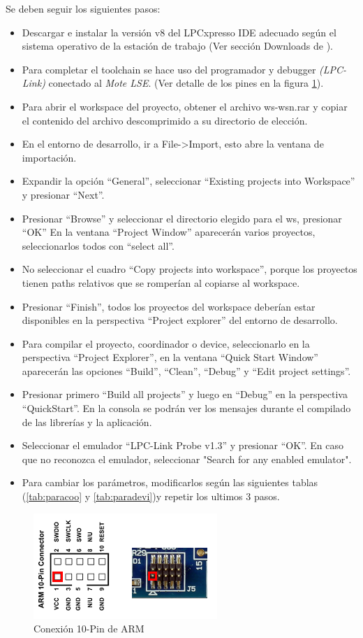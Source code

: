 Se deben seguir los siguientes pasos:
\begin{itemize}
	\item Descargar e instalar la versión v8 del LPCxpresso IDE adecuado según el sistema operativo de la estación de trabajo (Ver sección Downloads de \citep{IDE}).
	\item Para completar el toolchain se hace uso del programador y debugger \textit{(LPC-Link)} conectado al \textit{Mote LSE}. (Ver detalle de los pines en la figura \ref{fig:10pin}).
	\item Para abrir el workspace del proyecto, obtener el archivo ws-wsn.rar y copiar el contenido del archivo descomprimido a su directorio de elección.
	\item En el entorno de desarrollo, ir a File->Import, esto abre la ventana de importación.
	\item Expandir la opción “General”, seleccionar “Existing projects into Workspace” y presionar “Next”.
	\item Presionar “Browse” y seleccionar el directorio elegido para el ws, presionar “OK” En la ventana “Project Window” aparecerán varios proyectos, seleccionarlos todos con “select all”.
	\item No seleccionar el cuadro “Copy projects into workspace”, porque los proyectos tienen paths relativos que se romperían al copiarse al workspace.
	\item Presionar “Finish”, todos los proyectos del workspace deberían estar disponibles en la perspectiva “Project explorer” del entorno de desarrollo.
	\item Para compilar el proyecto, coordinador o device, seleccionarlo en la perspectiva “Project Explorer”, en la ventana “Quick Start Window” aparecerán las opciones “Build”, “Clean”, “Debug” y “Edit project settings”.
	\item Presionar primero “Build all projects” y luego en “Debug” en la perspectiva “QuickStart”. En la consola se podrán ver los mensajes durante el compilado de las librerías y la aplicación.
	\item Seleccionar el emulador “LPC-Link Probe v1.3” y presionar “OK”. En caso que no reconozca el emulador, seleccionar "Search for any enabled emulator".
	\item Para cambiar los parámetros, modificarlos según las siguientes tablas (\ref{tab:paracoo} y \ref{tab:paradevi})y repetir los ultimos 3 pasos.
	\end{itemize}

\begin{figure}[h!]
	\centering
    \includegraphics[width=.5\textwidth]{./Figures/pin.png}
    	\caption{Conexión 10-Pin de ARM}
	\label{fig:10pin}
\end{figure}

